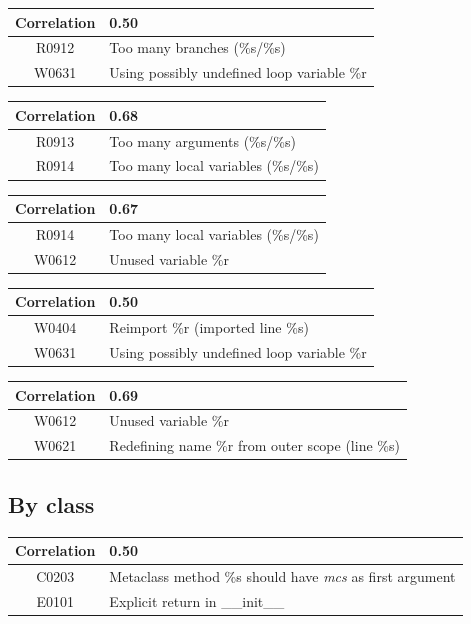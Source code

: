 \documentclass[12pt, a4paper]{article}
\newcommand{\tbf}[1]{\textbf{#1}}
\newcommand{\tit}[1]{\textit{#1}}
\newcommand{\noi}{\noindent}
\newcommand{\Cztwzth}{Metaclass method \%s should have \tit{mcs} as first argument}
\newcommand{\Ezozo}{Explicit return in \_\_init\_\_}
\newcommand{\mytab}[5]{
	\begin{tabularx}{\textwidth}{|c|X|}
	\hline
	\tbf{Correlation}		& #1 \\
	\hline
	#2	& #3 \\
	\hline
	#4	& #5 \\
	\hline
	\end{tabularx}
}
\begin{document}
\bigskip \noi
\begin{tabularx}{\textwidth}{|c|X|}
\hline
\tbf{Correlation}		& 0.50 \\
\hline
R0912		& Too many branches (\%s/\%s) \\
\hline
W0631		& Using possibly undefined loop variable \%r \\
\hline
\end{tabularx}


\bigskip \noi
\begin{tabularx}{\textwidth}{|c|X|}
\hline
\tbf{Correlation}		& 0.68 \\
\hline
R0913		& Too many arguments (\%s/\%s) \\
\hline
R0914		& Too many local variables (\%s/\%s) \\
\hline
\end{tabularx}


\bigskip \noi
\begin{tabularx}{\textwidth}{|c|X|}
\hline
\tbf{Correlation}		& 0.67 \\
\hline
R0914		& Too many local variables (\%s/\%s) \\
\hline
W0612		& Unused variable \%r \\
\hline
\end{tabularx}


\bigskip \noi
\begin{tabularx}{\textwidth}{|c|X|}
\hline
\tbf{Correlation}		& 0.50 \\
\hline
W0404		& Reimport \%r (imported line \%s) \\
\hline
W0631		& Using possibly undefined loop variable \%r \\
\hline
\end{tabularx}


\bigskip \noi
\begin{tabularx}{\textwidth}{|c|X|}
\hline
\tbf{Correlation}		& 0.69 \\
\hline
W0612		& Unused variable \%r \\
\hline
W0621		& Redefining name \%r from outer scope (line \%s) \\
\hline
\end{tabularx}



\subsection{By class}

\mytab{0.50}{C0203}{\Cztwzth{}}{E0101}{\Ezozo{}}
\end{document}
